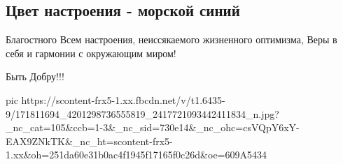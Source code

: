  
 
 
 
 

\subsection{Цвет настроения - морской синий}
\label{sec:11_04_2021.fb.spivak_dmitrij.1.foto}

Благостного Всем настроения, неиссякаемого жизненного оптимизма, Веры в себя и
гармонии с окружающим миром! 

Быть Добру!!!

\ifcmt
  pic https://scontent-frx5-1.xx.fbcdn.net/v/t1.6435-9/171811694_4201298736555819_2417721093442411834_n.jpg?_nc_cat=105&ccb=1-3&_nc_sid=730e14&_nc_ohc=csVQpY6xY-EAX9ZNkTK&_nc_ht=scontent-frx5-1.xx&oh=251da60e31b0ac4f1945f17165f0c26d&oe=609A5434
\fi

